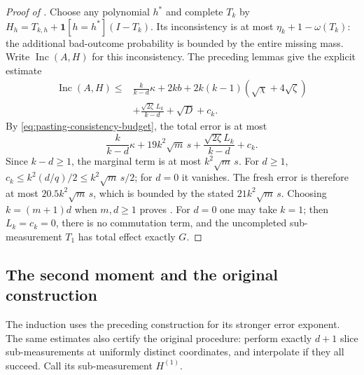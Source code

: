 \documentclass[11pt]{article}
\theoremstyle{definition}
\newcommand{\bone}{\boldsymbol{1}}
\begin{document}
\begin{proof}[Proof of ]
Choose any polynomial $h^*$ and complete $T_k$ by
$H_h=T_{k,h}+\bone[h=h^*](I-T_k)$.
Its inconsistency is at most $\eta_k+1-\omega(T_k)$: the additional
bad-outcome probability is bounded by the entire missing mass.
Write $\operatorname{Inc}(A,H)$ for this inconsistency.
The preceding lemmas give the explicit estimate
\begin{equation}\label{eq:positive-contraction-pasting}
 \begin{split}
 \operatorname{Inc}(A,H)\leq{}&\frac{k}{k-d}\kappa+2kb
       +2k(k-1)(\sqrt\chi+4\sqrt\zeta)\\
 &+\frac{\sqrt{2\zeta}\,L_k}{k-d}
       +\sqrt D+c_k.
 \end{split}
\end{equation}
By \eqref{eq:pasting-consistency-budget}, the total error is at most
\[
 \frac{k}{k-d}\kappa+19k^2\sqrt m\,s
       +\frac{\sqrt{2\zeta}L_k}{k-d}+c_k.
\]
Since $k-d\geq1$, the marginal term is at most
$k^2\sqrt m\,s$.  For $d\geq1$,
$c_k\leq k^2(d/q)/2\leq k^2\sqrt m\,s/2$; for $d=0$ it vanishes.
The fresh error is therefore at most $20.5k^2\sqrt m\,s$, which is
bounded by the stated $21k^2\sqrt m\,s$.
Choosing $k=(m+1)d$ when $m,d\geq1$ proves
.
For $d=0$ one may take $k=1$; then $L_k=c_k=0$, there is no
commutation term, and the uncompleted sub-measurement $T_1$ has
total effect exactly $G$.
\end{proof}

\subsection{The second moment and the original construction}
\label{sec:first-construction}

The induction uses the preceding construction for its stronger
error exponent.  The same estimates also certify the original
procedure: perform exactly $d+1$ slice sub-measurements at uniformly
distinct coordinates, and interpolate if they all succeed.
Call its sub-measurement $H^{(1)}$.
\end{document}
